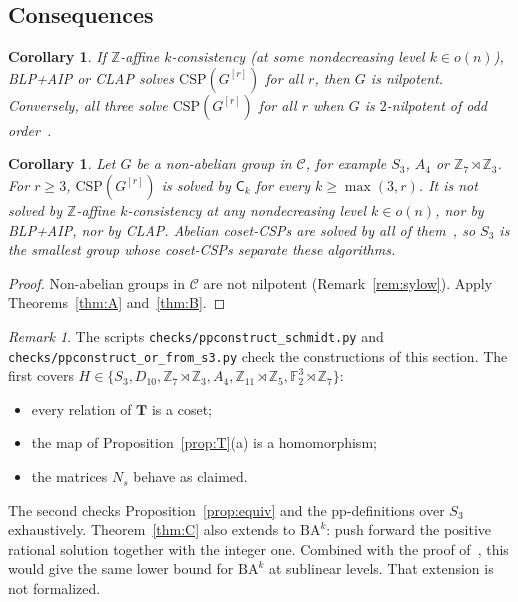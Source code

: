 \documentclass[11pt]{article}
\newtheorem{corollary}[theorem]{Corollary}
\theoremstyle{definition}
\theoremstyle{remark}
\newtheorem{remark}[theorem]{Remark}
\newcommand{\Csp}{\mathrm{CSP}}
\newcommand{\Coh}{\mathsf{C}}
\newcommand{\Z}{\mathbb Z}
\begin{document}
\subsection{Consequences}

\begin{corollary}\label{cor:nilp}
If $\Z$-affine $k$-consistency (at some nondecreasing level $k\in o(n)$), BLP+AIP
or CLAP solves $\Csp(G^{[r]})$ for all $r$, then $G$ is nilpotent. Conversely,
all three solve $\Csp(G^{[r]})$ for all $r$ when $G$ is $2$-nilpotent of odd
order~\cite[Thm.~1.2]{LP25}.
\end{corollary}

\begin{corollary}\label{cor:sep}
Let $G$ be a non-abelian group in $\mathcal C$, for example $S_3$, $A_4$ or
$\Z_7\rtimes\Z_3$. For $r\ge3$, $\Csp(G^{[r]})$ is solved by $\Coh_k$ for every
$k\ge\max(3,r)$. It is not solved by $\Z$-affine $k$-consistency at any
nondecreasing level $k\in o(n)$, nor by BLP+AIP, nor by CLAP. Abelian coset-CSPs
are solved by all of them~\cite[Thm.~1.2]{LP25}, so $S_3$ is the smallest group
whose coset-CSPs separate these algorithms.
\end{corollary}
\begin{proof}
Non-abelian groups in $\mathcal C$ are not nilpotent (Remark~\ref{rem:sylow}).
Apply Theorems~\ref{thm:A} and~\ref{thm:B}.
\end{proof}

\begin{remark}
The scripts \texttt{checks/ppconstruct\_schmidt.py} and
\texttt{checks/ppconstruct\_or\_from\_s3.py} check the constructions of this
section. The first covers $H\in\{S_3,D_{10},\Z_7\rtimes\Z_3,A_4,\Z_{11}\rtimes\Z_5,\mathbb F_2^3\rtimes\Z_7\}$:
\begin{itemize}
\item every relation of $\mathbf T$ is a coset;
\item the map of Proposition~\ref{prop:T}(a) is a homomorphism;
\item the matrices $N_s$ behave as claimed.
\end{itemize}
The second checks Proposition~\ref{prop:equiv} and the pp-definitions over $S_3$
exhaustively. Theorem~\ref{thm:C} also extends to $\mathrm{BA}^k$: push forward the
positive rational solution together with the integer one. Combined with the proof
of~\cite[Thm.~5.5]{LP25}, this would give the same lower bound for $\mathrm{BA}^k$
at sublinear levels. That extension is not formalized.
\end{remark}
\end{document}
